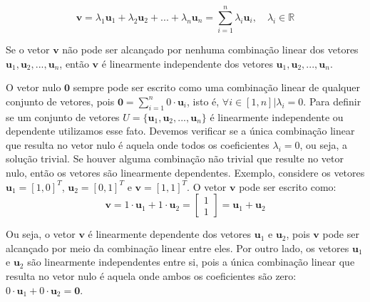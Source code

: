 \begin{equation*}
    \mathbf{v} = \lambda_1 \mathbf{u}_1 + \lambda_2 \mathbf{u}_2 + ... + \lambda_n \mathbf{u}_n = \sum_{i=1}^{n} \lambda_i \mathbf{u}_i, \quad \lambda_i \in \mathbb{R}
\end{equation*} 


Se o vetor $\mathbf{v}$ não pode ser alcançado por nenhuma combinação linear dos vetores $\mathbf{u}_1, \mathbf{u}_2, ..., \mathbf{u}_n$, então $\mathbf{v}$ é linearmente independente dos vetores $\mathbf{u}_1, \mathbf{u}_2, ..., \mathbf{u}_n$.

O vetor nulo $\mathbf{0}$ sempre pode ser escrito como uma combinação linear de qualquer conjunto de vetores, pois $\mathbf{0} = \sum_{i=1}^{n} 0 \cdot \mathbf{u}_i$, isto é, $\forall i \in [1, n] | \lambda_i = 0$. Para definir se um conjunto de vetores $U=\{\mathbf{u}_1, \mathbf{u}_2, ..., \mathbf{u}_n\}$ é linearmente independente ou dependente utilizamos esse fato. Devemos verificar se a única combinação linear que resulta no vetor nulo é aquela onde todos os coeficientes $\lambda_i = 0$, ou seja, a solução trivial. Se houver alguma combinação não trivial que resulte no vetor nulo, então os vetores são linearmente dependentes. Exemplo, considere os vetores $\mathbf{u}_1 = [1, 0]^T$, $\mathbf{u}_2 = [0, 1]^T$ e $\mathbf{v} = [1, 1]^T$. O vetor $\mathbf{v}$ pode ser escrito como:
\begin{equation*}
    \mathbf{v} = 1 \cdot \mathbf{u}_1 + 1 \cdot \mathbf{u}_2 = \begin{bmatrix}1 \\
1
\end{bmatrix} = \mathbf{u}_1 + \mathbf{u}_2
\end{equation*}

Ou seja, o vetor $\mathbf{v}$ é linearmente dependente dos vetores $\mathbf{u}_1$ e $\mathbf{u}_2$, pois $\mathbf{v}$ pode ser alcançado por meio da combinação linear entre eles. Por outro lado, os vetores $\mathbf{u}_1$ e $\mathbf{u}_2$ são linearmente independentes entre si, pois a única combinação linear que resulta no vetor nulo é aquela onde ambos os coeficientes são zero: $0 \cdot \mathbf{u}_1 + 0 \cdot \mathbf{u}_2 = \mathbf{0}$.
